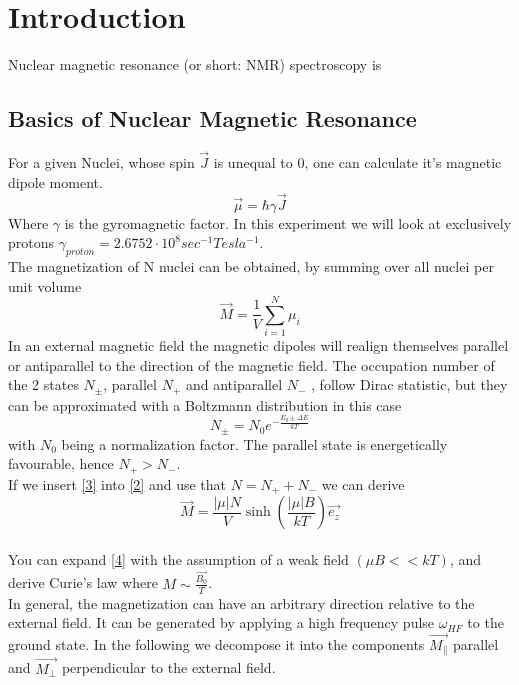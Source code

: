 \section{Introduction}\label{intro}
Nuclear magnetic resonance (or short: NMR) spectroscopy is 
\subsection{Basics of Nuclear Magnetic Resonance}\label{basics}
For a given Nuclei, whose spin $\vec{J}$ is unequal to 0, one can calculate it's magnetic dipole moment. 
\begin{equation}
	\label{1}
	\vec{\mu} = \hbar \gamma \vec{J}
\end{equation}
Where $\gamma$ is the gyromagnetic factor. In this experiment we will look at exclusively protons $\gamma_{proton} = 2.6752 \cdot 10^8 sec^{-1} Tesla^{-1}$.
\vspace{5mm} \\
The magnetization of N nuclei can be obtained, by summing over all nuclei per unit volume
\begin{equation}
	\label{2}
	\vec{M} = \dfrac{1}{V} \sum^{N}_{i=1} \mu_i
\end{equation}
In an external magnetic field the magnetic dipoles will realign themselves parallel or antiparallel to the direction of the magnetic field. The occupation number of the 2 states $N_{\pm}$, parallel $N_{+}$ and antiparallel $N_{-}$ , follow Dirac statistic, but they can be approximated with a Boltzmann distribution in this case 
\begin{equation}
	\label{3}
	N_{\pm}=N_0 e^{-\frac{E_0 \pm \Delta E}{kT}}
\end{equation}
with $N_0$ being a normalization factor. The parallel state is energetically favourable, hence $N_{+} > N_{-}$. 
\vspace{3mm} \\
If we insert \eqref{3} into \eqref{2} and use that $N = N_+ + N_-$ we can derive
\begin{equation}
	\label{4}
	\vec M =\frac{|\mu| N}{V} \sinh(\frac{|\mu| B}{kT}) \vec{e_z}
\end{equation}\\
You can expand \eqref{4} with the assumption of a weak field $(\mu B << kT)$, and derive Curie's law where $M \sim \frac{\vec{B_{0}}}{T}$. 
\vspace{5mm} \\
In general, the magnetization can have an arbitrary direction relative to the external field. It can be generated by applying a high frequency pulse $\omega_{HF}$ to the ground state. In the following we decompose it into the components $\vec{M_{\parallel}}$ parallel and $\vec{M_{\perp}}$ perpendicular to the external field. 
